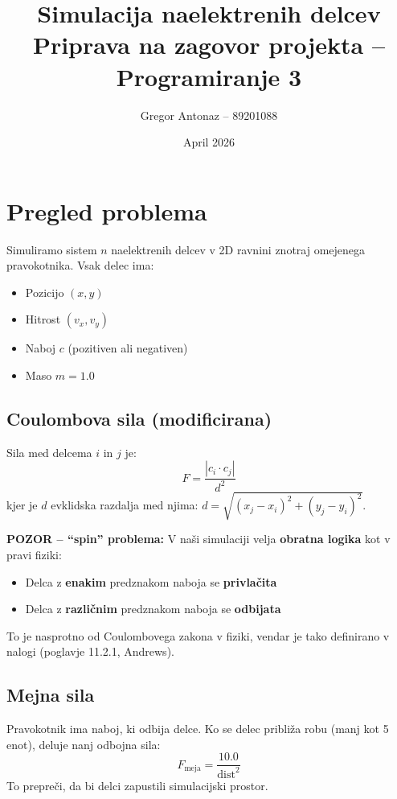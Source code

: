 \documentclass[12pt,a4paper]{article}
\title{\textbf{Simulacija naelektrenih delcev} \\ \large Priprava na zagovor projekta -- Programiranje 3}
\author{Gregor Antonaz -- 89201088}
\date{April 2026}
\begin{document}
\maketitle
\tableofcontents
\newpage

\section{Pregled problema}

Simuliramo sistem $n$ naelektrenih delcev v 2D ravnini znotraj omejenega pravokotnika. Vsak delec ima:
\begin{itemize}
    \item Pozicijo $(x, y)$
    \item Hitrost $(v_x, v_y)$
    \item Naboj $c$ (pozitiven ali negativen)
    \item Maso $m = 1.0$
\end{itemize}

\subsection{Coulombova sila (modificirana)}

Sila med delcema $i$ in $j$ je:
\[
F = \frac{|c_i \cdot c_j|}{d^2}
\]
kjer je $d$ evklidska razdalja med njima: $d = \sqrt{(x_j - x_i)^2 + (y_j - y_i)^2}$.

\begin{kljucno}
\textbf{POZOR -- ``spin'' problema:} V na\v{s}i simulaciji velja \textbf{obratna logika} kot v pravi fiziki:
\begin{itemize}
    \item Delca z \textbf{enakim} predznakom naboja se \textbf{privla\v{c}ita}
    \item Delca z \textbf{razli\v{c}nim} predznakom naboja se \textbf{odbijata}
\end{itemize}
To je nasprotno od Coulombovega zakona v fiziki, vendar je tako definirano v nalogi (poglavje 11.2.1, Andrews).
\end{kljucno}

\subsection{Mejna sila}

Pravokotnik ima naboj, ki odbija delce. Ko se delec pribli\v{z}a robu (manj kot 5 enot), deluje nanj odbojna sila:
\[
F_{\text{meja}} = \frac{10.0}{\text{dist}^2}
\]
To prepre\v{c}i, da bi delci zapustili simulacijski prostor.
\end{document}

